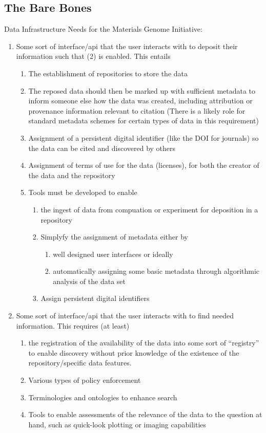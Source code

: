 \subsection{The Bare Bones}
Data Infrastructure Needs for the Materials Genome Initiative:
\begin{enumerate}
\item Some sort of interface/api that the user interacts with to deposit their information such that (2) is enabled.  This entails
\begin{enumerate}
\item The establishment of repositories to store the data
\item The reposed data should then be marked up with sufficient metadata to inform someone else how the data was created, including attribution or provenance information relevant to citation 
(There is a likely role for standard metadata schemes for certain types of data in this requirement)
\item	Assignment of a persistent digital identifier (like the DOI for journals) so the data can be cited and discovered by others
\item Assignment of terms of use for the data (licenses), for both the
  creator of the data and the repository
\item Tools must be developed to enable 
\begin{enumerate}
\item the ingest of data from compuation or experiment for deposition
  in a repository
\item  Simplyfy the assignment of metadata either by
\begin{enumerate}
\item  well designed user interfaces or ideally 
\item automatically assigning some basic metadata through algorithmic
  analysis of the data set
\end{enumerate}
\item 	Assign persistent digital identifiers
\end{enumerate}
\end{enumerate}
\item  Some sort of interface/api that the user interacts with to find
  needed information.  This requires (at least)
\begin{enumerate}
\item	the registration of the availability of the data into some sort of “registry” to enable discovery without prior knowledge of the existence of the repository/specific data features.
\item Various types of policy enforcement  
\item	Terminologies and ontologies to enhance search 
\item	Tools to enable assessments of the relevance of the data to the question at hand, such as quick-look plotting or imaging capabilities
\end{enumerate}
\end{enumerate}




